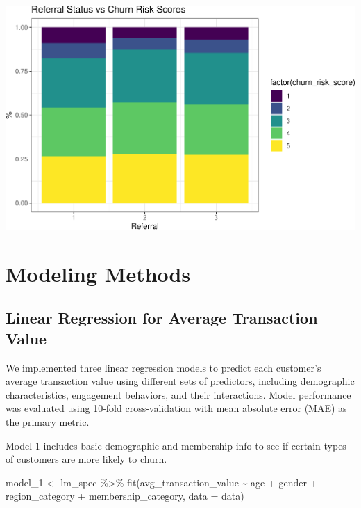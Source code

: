 \documentclass[
  letterpaper,
  DIV=11,
  numbers=noendperiod]{scrartcl}
\newenvironment{Shaded}{\begin{snugshade}}{\end{snugshade}}
\newcommand{\AttributeTok}[1]{\textcolor[rgb]{0.40,0.45,0.13}{#1}}
\newcommand{\FunctionTok}[1]{\textcolor[rgb]{0.28,0.35,0.67}{#1}}
\newcommand{\NormalTok}[1]{\textcolor[rgb]{0.00,0.23,0.31}{#1}}
\newcommand{\OtherTok}[1]{\textcolor[rgb]{0.00,0.23,0.31}{#1}}
\newcommand{\SpecialCharTok}[1]{\textcolor[rgb]{0.37,0.37,0.37}{#1}}
\begin{document}
\begin{center}
\includegraphics{FPCP4_files/figure-pdf/unnamed-chunk-23-1.pdf}
\end{center}

\section{Modeling Methods}\label{modeling-methods}

\subsection{Linear Regression for Average Transaction
Value}\label{linear-regression-for-average-transaction-value}

We implemented three linear regression models to predict each customer's
average transaction value using different sets of predictors, including
demographic characteristics, engagement behaviors, and their
interactions. Model performance was evaluated using 10-fold
cross-validation with mean absolute error (MAE) as the primary metric.

Model 1 includes basic demographic and membership info to see if certain
types of customers are more likely to churn.

\begin{Shaded}
\begin{Highlighting}[]
\NormalTok{model\_1 }\OtherTok{\textless{}{-}}\NormalTok{ lm\_spec }\SpecialCharTok{\%\textgreater{}\%} \FunctionTok{fit}\NormalTok{(avg\_transaction\_value }\SpecialCharTok{\textasciitilde{}}\NormalTok{ age }\SpecialCharTok{+}\NormalTok{ gender }\SpecialCharTok{+}\NormalTok{ region\_category }\SpecialCharTok{+}\NormalTok{ membership\_category, }\AttributeTok{data =}\NormalTok{ data)}
\end{Highlighting}
\end{Shaded}
\end{document}
